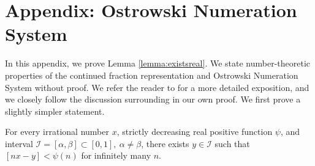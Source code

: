 \section{Appendix: Ostrowski Numeration System}
\label{appendix:ostrowski}

In this appendix, we prove Lemma \ref{lemma:existsreal}. We state number-theoretic properties of the continued fraction representation and Ostrowski Numeration System without proof. We refer the reader to \cite{bourla2016ostrowski} for a more detailed exposition, and we closely follow the discussion surrounding \cite[Propositions 1.1, 2.1]{berthe2022dynamics} in our own proof. We first prove a slightly simpler statement.

\begin{lemma}
\label{lemma:existsreal2}
For every irrational number $x$, strictly decreasing real positive function $\psi$, and interval $\mathcal{I} = [\alpha, \beta] \subset [0, 1], ~ \alpha \ne \beta$, there exists $y \in \mathcal{I}$ such that $[nx - y] < \psi(n)$ for infinitely many $n$.
\end{lemma}
